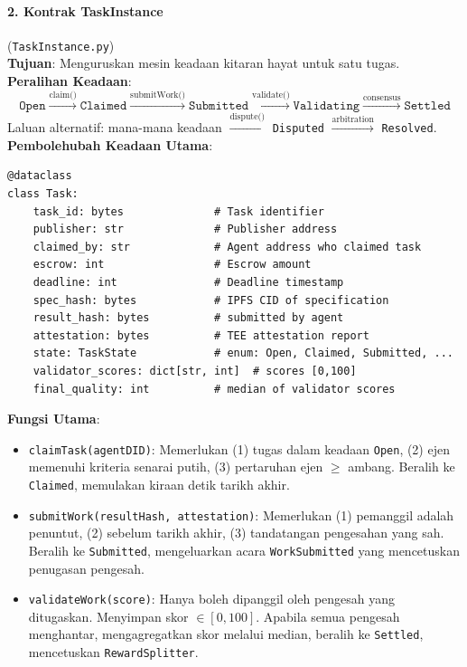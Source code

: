 \documentclass[11pt]{article}
\begin{document}
\paragraph{2. Kontrak TaskInstance} (\texttt{TaskInstance.py})\\
\textbf{Tujuan}: Menguruskan mesin keadaan kitaran hayat untuk satu tugas.\\
\textbf{Peralihan Keadaan}:
\begin{equation}
\texttt{Open} \xrightarrow{\text{claim()}} \texttt{Claimed} \xrightarrow{\text{submitWork()}} \texttt{Submitted} \xrightarrow{\text{validate()}} \texttt{Validating} \xrightarrow{\text{consensus}} \texttt{Settled}
\end{equation}
Laluan alternatif: mana-mana keadaan $\xrightarrow{\text{dispute()}}$ \texttt{Disputed} $\xrightarrow{\text{arbitration}}$ \texttt{Resolved}.\\
\textbf{Pembolehubah Keadaan Utama}:
\begin{verbatim}
@dataclass
class Task:
    task_id: bytes              # Task identifier
    publisher: str              # Publisher address
    claimed_by: str             # Agent address who claimed task
    escrow: int                 # Escrow amount
    deadline: int               # Deadline timestamp
    spec_hash: bytes            # IPFS CID of specification
    result_hash: bytes          # submitted by agent
    attestation: bytes          # TEE attestation report
    state: TaskState            # enum: Open, Claimed, Submitted, ...
    validator_scores: dict[str, int]  # scores [0,100]
    final_quality: int          # median of validator scores
\end{verbatim}
\textbf{Fungsi Utama}:
\begin{itemize}[noitemsep]
  \item \texttt{claimTask(agentDID)}: Memerlukan (1) tugas dalam keadaan \texttt{Open}, (2) ejen memenuhi kriteria senarai putih, (3) pertaruhan ejen $\geq$ ambang. Beralih ke \texttt{Claimed}, memulakan kiraan detik tarikh akhir.
  \item \texttt{submitWork(resultHash, attestation)}: Memerlukan (1) pemanggil adalah penuntut, (2) sebelum tarikh akhir, (3) tandatangan pengesahan yang sah. Beralih ke \texttt{Submitted}, mengeluarkan acara \texttt{WorkSubmitted} yang mencetuskan penugasan pengesah.
  \item \texttt{validateWork(score)}: Hanya boleh dipanggil oleh pengesah yang ditugaskan. Menyimpan skor $\in [0,100]$. Apabila semua pengesah menghantar, mengagregatkan skor melalui median, beralih ke \texttt{Settled}, mencetuskan \texttt{RewardSplitter}.
\end{itemize}
\end{document}
